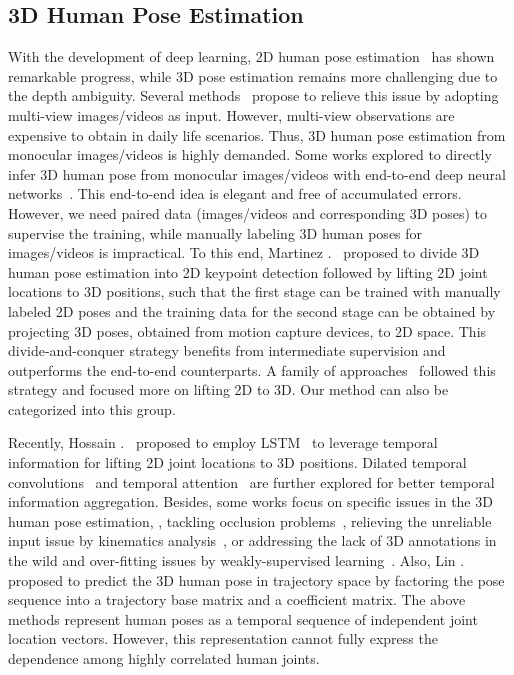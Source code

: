 \documentclass[sigconf]{acmart}
\begin{document}
\subsection{3D Human Pose Estimation}
\label{sec:3dhpe}
With the development of deep learning, 2D human pose estimation~\cite{newell2016stacked,chen2018cascaded,sun2019deep,cao2019openpose} has shown remarkable progress, while 3D pose estimation remains more challenging due to the depth ambiguity.
Several methods~\cite{liang2019shape,qiu2019cross,iskakov2019learnable,he2020epipolar,voxelpose} propose to relieve this issue by adopting multi-view images/videos as input.
However, multi-view observations are expensive to obtain in daily life scenarios.
Thus, 3D human pose estimation from monocular images/videos is highly demanded.
Some works explored to directly infer 3D human pose from monocular images/videos with end-to-end deep neural networks~\cite{pavlakos2017coarse,tekin2016structured}.
This end-to-end idea is elegant and free of accumulated errors.
However, we need paired data (images/videos and corresponding 3D poses) to supervise the training, while manually labeling 3D human poses for images/videos is impractical.
To this end, Martinez \etal.~\cite{martinez2017simple} proposed to divide 3D human pose estimation into 2D keypoint detection followed by lifting 2D joint locations to 3D positions, such that the first stage can be trained with manually labeled 2D poses and the training data for the second stage can be obtained by projecting 3D poses, obtained from motion capture devices, to 2D space.    
This divide-and-conquer strategy benefits from intermediate supervision and outperforms the end-to-end counterparts.
A family of approaches~\cite{chen20173d,hossain2018exploiting,pavllo20193d,wang2020motion,cheng2019occlusion,zeng2020srnet,ci2019optimizing,zhang2021deep} followed this strategy and focused more on lifting 2D to 3D.
Our method can also be categorized into this group.


Recently, Hossain \etal.~\cite{hossain2018exploiting} proposed to employ LSTM~\cite{hochreiter1997long} to leverage temporal information for lifting 2D joint locations to 3D positions.
Dilated temporal convolutions~\cite{pavllo20193d} and temporal attention~\cite{liu2020attention} are further explored for better temporal information aggregation.
Besides, some works focus on specific issues in the 3D human pose estimation, \eg, tackling occlusion problems~\cite{cheng2019occlusion,cheng20203d}, relieving the unreliable input issue by kinematics analysis~\cite{xu2020deep}, or addressing the lack of 3D annotations in the wild and over-fitting issues by weakly-supervised learning~\cite{iqbal2020weakly,pavllo20193d,wandt2019repnet}.
Also, Lin \etal.~\cite{lin2019trajectory} proposed to predict the 3D human pose in trajectory space by factoring the pose sequence into a trajectory base matrix and a coefficient matrix. 
The above methods represent human poses as a temporal sequence of independent joint location vectors. However, this representation cannot fully express the dependence among highly correlated human joints. 
\end{document}

